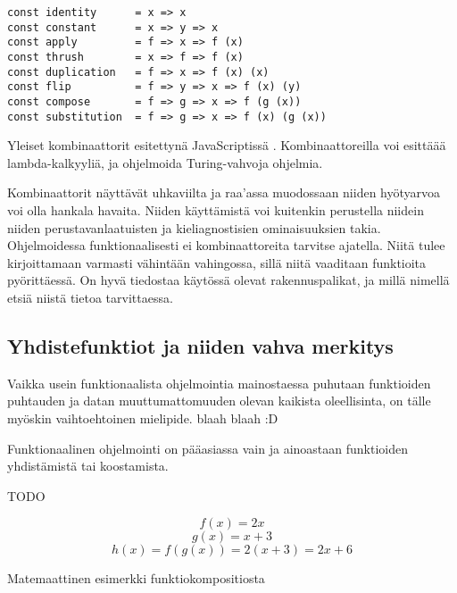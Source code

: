 \begin{code}
	\begin{verbatim}
const identity      = x => x
const constant      = x => y => x
const apply         = f => x => f (x)
const thrush        = x => f => f (x)
const duplication   = f => x => f (x) (x)
const flip          = f => y => x => f (x) (y)
const compose       = f => g => x => f (g (x))
const substitution  = f => g => x => f (x) (g (x))

\end{verbatim}
	\caption{Yleiset kombinaattorit esitettynä JavaScriptissä \cite{javascript_combinators}. Kombinaattoreilla voi esittäää lambda-kalkyyliä, ja ohjelmoida Turing-vahvoja ohjelmia.}
	\label{code:javascript_combinators}
\end{code}

Kombinaattorit näyttävät uhkaviilta ja raa'assa muodossaan niiden hyötyarvoa voi olla hankala havaita. Niiden käyttämistä voi kuitenkin perustella niidein niiden perustavanlaatuisten ja kieliagnostisien ominaisuuksien takia. Ohjelmoidessa funktionaalisesti ei kombinaattoreita tarvitse ajatella. Niitä tulee kirjoittamaan varmasti vähintään vahingossa, sillä niitä vaaditaan funktioita pyörittäessä. On hyvä tiedostaa käytössä olevat rakennuspalikat, ja millä nimellä etsiä niistä tietoa tarvittaessa.

\subsection{Yhdistefunktiot ja niiden vahva merkitys}

Vaikka usein funktionaalista ohjelmointia mainostaessa puhutaan funktioiden puhtauden ja datan muuttumattomuuden olevan kaikista oleellisinta, on tälle myöskin vaihtoehtoinen mielipide. blaah blaah :D

Funktionaalinen ohjelmointi on pääasiassa vain ja ainoastaan funktioiden yhdistämistä tai koostamista.



TODO

\begin{code}
	\begin{equation}
		f(x) = 2x
	\end{equation}
	\begin{equation}
		g(x) = x + 3
	\end{equation}
	\begin{equation}
		h(x) = f(g(x)) = 2(x + 3) = 2x + 6
	\end{equation}
	\caption{Matemaattinen esimerkki funktiokompositiosta}
	\label{equation:composition}
\end{code}
\bigskip


